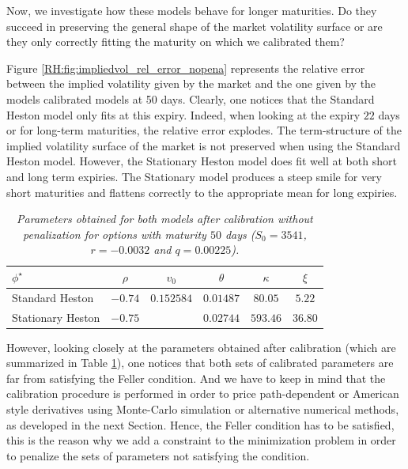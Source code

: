 Now, we investigate how these models behave for longer maturities. Do they succeed in preserving the general shape of the market volatility surface or are they only correctly fitting the maturity on which we calibrated them?

Figure \ref{RH:fig:impliedvol_rel_error_nopena} represents the relative error between the implied volatility given by the market and the one given by the models calibrated models at 50 days. Clearly, one notices that the Standard Heston model only fits at this expiry. Indeed, when looking at the expiry $22$ days or for long-term maturities, the relative error explodes. The term-structure of the implied volatility surface of the market is not preserved when using the Standard Heston model. However, the Stationary Heston model does fit well at both short and long term expiries. The Stationary model produces a steep smile for very short maturities and flattens correctly to the appropriate mean for long expiries.



\begin{table}[H]
	\centering
	\begin{tabular}{l||ccccc}
		\toprule
		$\phi^{\star}$    & $\rho$  & $v_0$      & $\theta$  & $\kappa$ & $\xi$   \\ \midrule \midrule
		Standard Heston   & $-0.74$ & $0.152584$ & $0.01487$ & $80.05$  & $5.22$  \\ \midrule
		Stationary Heston & $-0.75$ &            & $0.02744$ & $593.46$ & $36.80$ \\ \bottomrule
	\end{tabular}
	\caption[Parameters obtained for both models after calibration without penalization.]{\textit{Parameters obtained for both models after calibration without penalization for options with maturity $50$ days ($S_0 = 3541$, $r=-0.0032$ and $q=0.00225$).}}
	\label{RH:tab:params_nopena}
\end{table}

However, looking closely at the parameters obtained after calibration (which are summarized in Table \ref{RH:tab:params_nopena}), one notices that both sets of calibrated parameters are far from satisfying the Feller condition. And we have to keep in mind that the calibration procedure is performed in order to price path-dependent or American style derivatives using Monte-Carlo simulation or alternative numerical methods, as developed in the next Section. Hence, the Feller condition has to be satisfied, this is the reason why we add a constraint to the minimization problem in order to penalize the sets of parameters not satisfying the condition.



